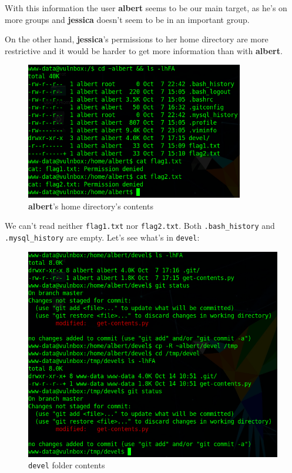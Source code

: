 \documentclass[12pt]{article}
\begin{document}
    With this information the user \textbf{albert} seems to be our main target,
    as he's on more groups and \textbf{jessica} doesn't seem to be in an
    important group.

    On the other hand, \textbf{jessica}'s permissions to her home directory
    are more restrictive and it would be harder to get more information than
    with \textbf{albert}.

    \begin{figure}[H]\label{pic:41-albert-home}
        \centering
        \includegraphics[width=0.85\textwidth]{41-albert-home.png}
        \caption{\textbf{albert}'s home directory's contents}
    \end{figure}

    We can't read neither \texttt{flag1.txt} nor \texttt{flag2.txt}. Both
    \texttt{.bash\_history} and \texttt{.mysql\_history} are empty. Let's see
    what's in \texttt{devel}:

    \begin{figure}[H]\label{pic:42-devel-contents}
        \centering
        \includegraphics[width=1.00\textwidth]{42-devel-contents.png}
        \caption{\texttt{devel} folder contents}
    \end{figure}
\end{document}

